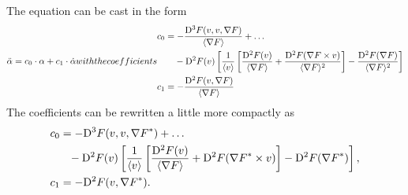 The equation can be cast in the form
\begin{subequations}
    \begin{align}
        \ddot{ \alpha }   =
        c_0 \mult \alpha  +
        c_1 \mult \dot{ \alpha }
    \end{align}
    with the coefficients
    \begin{align}
        &\begin{aligned}
            c_0   &=
            - \frac{ \diff{3}{F}( v, v, \grad{F} ) }{ \skaq{\grad{F}} }  +  \dots \\
            &\hphantom{={}}- \diff{2}{F}( v )
            \left[ \frac{ 1 }{ \skaq{v} }
            \left[ \frac{ \diff{2}{F}( v ) }{ \skaq{\grad{F}} }  +
            \frac{ \diff{2}{F}( \grad{F} \times v ) }{ \skaq{\grad{F}}^2 } \right]  -
            \frac{ \diff{2}{F}( \grad{F} ) }{ \skaq{\grad{F}}^2 } \right]
        \end{aligned}\\
        &c_1   =
        - \frac{ \diff{2}{F}( v, \grad{F} ) }{ \skaq{\grad{F}} }
    \end{align}
\end{subequations}
The coefficients can be rewritten a little more compactly as
\begin{subequations}
    \begin{align}
        &\begin{aligned}
            c_0   &=
            - \mathrm{D}^{ 3 }F( v, v, {\nabla F}^* )  +  \dots \\
            &\hphantom{=}-\mathrm{D}^{ 2 }F( v )
            \left[ \frac{ 1 }{ \langle v \rangle }
            \left[ \frac{ \mathrm{D}^{ 2 }F( v ) }{ \langle \nabla F \rangle }  +
            \mathrm{D}^{ 2 }F( {\nabla F}^* \times v ) \right]  -
            \mathrm{D}^{ 2 }F( {\nabla F}^* ) \right] ,
        \end{aligned}\\
        &c_1   =   - \mathrm{D}^{ 2 }F( v, {\nabla F}^* ) .
    \end{align}
\end{subequations}




